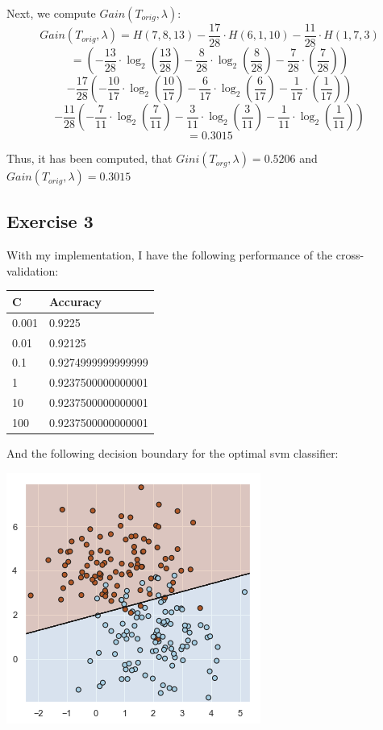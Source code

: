 \documentclass{report}
\begin{document}
Next, we compute $Gain(T_{orig}, \lambda)$:
$$Gain(T_{orig}, \lambda) = H(7, 8, 13) - \frac{17}{28} \cdot H(6, 1, 10) - \frac{11}{28} \cdot H(1, 7, 3)$$
$$ = \left(-\frac{13}{28} \cdot \log_2 \left(\frac{13}{28} \right) - \frac{8}{28} \cdot \log_2 \left( \frac{8}{28} \right) - \frac{7}{28} \cdot \left( \frac{7}{28} \right) \right)$$
$$ - \frac{17}{28} \left( - \frac{10}{17} \cdot \log_2 \left( \frac{10}{17} \right) - \frac{6}{17} \cdot \log_2 \left( \frac{6}{17} \right) - \frac{1}{17} \cdot \left( \frac{1}{17} \right) \right)$$
$$ - \frac{11}{28} \left( - \frac{7}{11} \cdot \log_2 \left( \frac{7}{11} \right) - \frac{3}{11} \cdot \log_2 \left( \frac{3}{11} \right) - \frac{1}{11} \cdot \log_2 \left( \frac{1}{11} \right) \right)$$
$$= 0.3015$$

Thus, it has been computed, that $Gini(T_{org}, \lambda) = 0.5206$ and $Gain(T_{orig}, \lambda) = 0.3015$

\subsection*{Exercise 3}
With my implementation, I have the following performance of the cross-validation:
\begin{center}
    \begin{tabular}{|l|l|}
        \hline
        C & Accuracy \\
        \hline
        0.001 & 0.9225 \\
        \hline
        0.01 & 0.92125 \\
        \hline
        0.1 & 0.9274999999999999 \\
        \hline
        1 & 0.9237500000000001 \\
        \hline
        10 & 0.9237500000000001 \\
        \hline
        100 & 0.9237500000000001 \\
        \hline
    \end{tabular}
\end{center}
And the following decision boundary for the optimal svm classifier:
\begin{center}
    \includegraphics[height = 7 cm]{3_decision_boundary.png}
\end{center}
\end{document}

